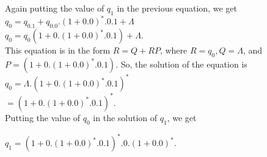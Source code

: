 \documentclass[9pt]{beamer}
\begin{document}
\begin{frame}
\hspace*{0.5cm} Again putting the value of $q_1$ in the previous equation, we get\\

\vspace*{0.1cm}
\hspace*{3cm} $q_0 = q_0.1 + q_0.0. (1 + 0.0)^*.0.1 + \Lambda$ \\

\hspace*{3cm} $q_0 = q_0(1 + 0.(1 + 0.0)^*.0.1) + \Lambda.$ \\

\vspace*{0.1cm}
\hspace*{0.5cm} This equation is in the form $R = Q + RP$, where $R = q_0, Q = \Lambda$, and $P = (1 + 0.(1 + 0.0)^*.0.1)$. So, the
solution of the equation is\\

\hspace*{3cm} $q_0 = \Lambda.(1 + 0.(1 + 0.0)^*.0.1)^*$ \\
\hspace*{3.4cm} $= (1 + 0.(1 + 0.0)^*.0.1)^*.$ \\

\vspace*{0.1cm}
Putting the value of $q_0$ in the solution of $q_1$, we get\\
\vspace*{0.1cm}

\hspace*{2.5cm} $q_1 = (1 + 0.(1 + 0.0)^*.0.1)^*.0. (1 + 0.0)^*.$ \\
\end{frame}
\end{document}

